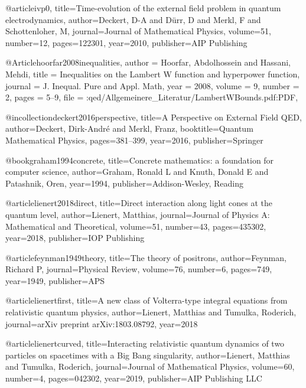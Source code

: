 @article{ivp0,
  title={Time-evolution of the external field problem in quantum electrodynamics},
  author={Deckert, D-A and D{\"u}rr, D and Merkl, F and Schottenloher, M},
  journal={Journal of Mathematical Physics},
  volume={51},
  number={12},
  pages={122301},
  year={2010},
  publisher={AIP Publishing}
}


@Article{hoorfar2008inequalities,
  author  = {Hoorfar, Abdolhossein and Hassani, Mehdi},
  title   = {Inequalities on the Lambert W function and hyperpower function},
  journal = {J. Inequal. Pure and Appl. Math},
  year    = {2008},
  volume  = {9},
  number  = {2},
  pages   = {5--9},
  file    = {:qed/Allgemeinere_Literatur/LambertWBounds.pdf:PDF},
}



@incollection{deckert2016perspective,
  title={A Perspective on External Field QED},
  author={Deckert, Dirk-Andr{\'e} and Merkl, Franz},
  booktitle={Quantum Mathematical Physics},
  pages={381--399},
  year={2016},
  publisher={Springer}
}

@book{graham1994concrete,
  title={Concrete mathematics: a foundation for computer science},
  author={Graham, Ronald L and Knuth, Donald E and Patashnik, Oren},
  year={1994},
  publisher={Addison-Wesley, Reading}
}

@article{lienert2018direct,
  title={Direct interaction along light cones at the quantum level},
  author={Lienert, Matthias},
  journal={Journal of Physics A: Mathematical and Theoretical},
  volume={51},
  number={43},
  pages={435302},
  year={2018},
  publisher={IOP Publishing}
}

@article{feynman1949theory,
  title={The theory of positrons},
  author={Feynman, Richard P},
  journal={Physical Review},
  volume={76},
  number={6},
  pages={749},
  year={1949},
  publisher={APS}
}

@article{lienertfirst,
  title={A new class of Volterra-type integral equations from relativistic quantum physics},
  author={Lienert, Matthias and Tumulka, Roderich},
  journal={arXiv preprint arXiv:1803.08792},
  year={2018}
}

@article{lienertcurved,
  title={Interacting relativistic quantum dynamics of two particles on spacetimes with a Big Bang singularity},
  author={Lienert, Matthias and Tumulka, Roderich},
  journal={Journal of Mathematical Physics},
  volume={60},
  number={4},
  pages={042302},
  year={2019},
  publisher={AIP Publishing LLC}
}

